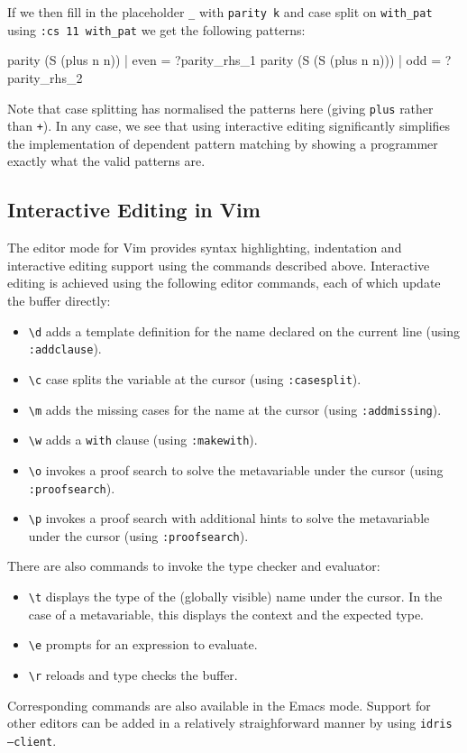 \noindent
If we then fill in the placeholder \verb!_! with \verb!parity k! and case split on \verb!with_pat! using \verb!:cs 11 with_pat! we get the following patterns:

\begin{code}
  parity (S (plus n n)) | even = ?parity_rhs_1
  parity (S (S (plus n n))) | odd = ?parity_rhs_2
\end{code}

\noindent
Note that case splitting has normalised the patterns here (giving \texttt{plus} rather than \texttt{+}).
In any case, we see that using interactive editing significantly simplifies the implementation of dependent pattern matching by showing a programmer exactly what the valid patterns are.

\subsection{Interactive Editing in Vim}

The editor mode for Vim provides syntax highlighting, indentation and interactive editing support using the commands described above.
Interactive editing is achieved using the following editor commands, each of which update the buffer directly:

\begin{itemize}
\item \verb!\d! adds a template definition for the name declared on the current line (using \texttt{:addclause}).
\item \verb!\c! case splits the variable at the cursor (using \texttt{:casesplit}).
\item \verb!\m! adds the missing cases for the name at the cursor (using \texttt{:addmissing}).
\item \verb!\w! adds a \texttt{with} clause (using \texttt{:makewith}). 
\item \verb!\o! invokes a proof search to solve the metavariable under the cursor (using \texttt{:proofsearch}).
\item \verb!\p! invokes a proof search with additional hints to solve the metavariable under the cursor (using \texttt{:proofsearch}).
\end{itemize}

\noindent
There are also commands to invoke the type checker and evaluator:

\begin{itemize}
\item\verb!\t! displays the type of the (globally visible) name under the cursor.
In the case of a metavariable, this displays the context and the expected type.
\item\verb!\e! prompts for an expression to evaluate.
\item\verb!\r! reloads and type checks the buffer.
\end{itemize}

\noindent
Corresponding commands are also available in the Emacs mode.
Support for other editors can be added in a relatively straighforward manner by using
\texttt{idris --client}.



